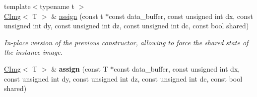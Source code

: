 \begin{DoxyCompactItemize}
\item 
\hypertarget{structcimg__library_1_1CImg_a1a87c63722b7368fed48fda58bf4c622}{
{\footnotesize template$<$typename t $>$ }\\\hyperlink{structcimg__library_1_1CImg}{CImg}$<$ T $>$ \& \hyperlink{structcimg__library_1_1CImg_a1a87c63722b7368fed48fda58bf4c622}{assign} (const t $\ast$const data\_\-buffer, const unsigned int dx, const unsigned int dy, const unsigned int dz, const unsigned int dc, const bool shared)}
\label{structcimg__library_1_1CImg_a1a87c63722b7368fed48fda58bf4c622}

\begin{DoxyCompactList}\small\item\em In-\/place version of the previous constructor, allowing to force the shared state of the instance image. \item\end{DoxyCompactList}\item 
\hypertarget{structcimg__library_1_1CImg_a6420b75966a5dae663c9835c89f0e4ac}{
\hyperlink{structcimg__library_1_1CImg}{CImg}$<$ T $>$ \& {\bfseries assign} (const T $\ast$const data\_\-buffer, const unsigned int dx, const unsigned int dy, const unsigned int dz, const unsigned int dc, const bool shared)}
\label{structcimg__library_1_1CImg_a6420b75966a5dae663c9835c89f0e4ac}


\end{DoxyCompactItemize}
